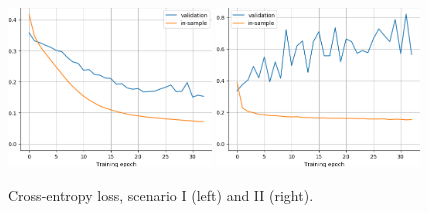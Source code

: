 \documentclass[12pt,a4paper]{article}
\begin{document}
    
    \begin{figure}[p]
        \centering
        \includegraphics[width=0.48\textwidth]{images/data_onlydida/last_history}
        \hfill
        \includegraphics[width=0.48\textwidth]{images/data_withjosm/last_history}
        
        \caption{Cross-entropy loss, scenario I (left) and II (right).}
        \label{f:loss}
    \end{figure}
    
\end{document}
